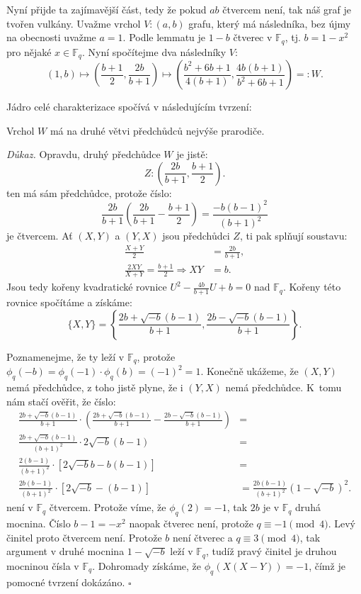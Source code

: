 \documentclass[12pt]{report}
\begin{document}
Nyní přijde ta zajímavější část, tedy že pokud $ab$ čtvercem není, tak náš graf je tvořen vulkány. Uvažme vrchol $V : (a,b)$ grafu, který má následníka, bez újmy na obecnosti uvažme $a=1$. Podle lemmatu je $1-b$ čtverec v $\mathbb{F}_q$, tj. $b = 1-x^2$ pro nějaké $x \in \mathbb{F}_q$. Nyní spočítejme dva následníky $V$:
$$ (1,b) \longmapsto \left(\frac{b+1}{2}, \frac{2b}{b+1} \right) \longmapsto \left( \frac{b^2+6b+1}{4(b+1)}, \frac{4b(b+1)}{b^2+6b+1} \right) =: W. $$

Jádro celé charakterizace spočívá v následujícím tvrzení:

\begin{lemma*}
Vrchol $W$ má na druhé větvi předchůdců nejvýše prarodiče.
\end{lemma*}
\noindent \textit{Důkaz.}  Opravdu, druhý předchůdce $W$ je jistě:
$$Z : \left(\frac{2b}{b+1}, \frac{b+1}{2} \right).$$
ten má sám předchůdce, protože číslo:
$$\frac{2b}{b+1} \left( \frac{2b}{b+1} -  \frac{b+1}{2} \right) = \frac{-b (b-1)^2}{(b+1)^2}$$
je čtvercem. Ať $(X,Y)$ a $(Y,X)$ jsou předchůdci $Z$, ti pak splňují soustavu:
\begin{align*}
\frac{X+Y}{2} &= \frac{2b}{b+1},\\
\frac{2XY}{X+Y} =  \frac{b+1}{2} \Rightarrow XY &= b.
\end{align*}
Jsou tedy kořeny kvadratické rovnice $U^2 - \frac{4b}{b+1} U + b = 0$ nad $\mathbb{F}_q$.  Kořeny této rovnice spočítáme a získáme:
$$\lbrace X,Y \rbrace = \left\lbrace \frac{2b + \sqrt{-b}(b-1)}{b+1},\frac{2b - \sqrt{-b}(b-1)}{b+1} \right\rbrace.$$

Poznamenejme, že ty leží v $\mathbb{F}_q$, protože $\phi_q(-b) = \phi_q(-1)\cdot \phi_q(b) = (-1)^2 = 1$. Konečně ukážeme, že $(X,Y)$ nemá předchůdce, z toho jistě plyne, že i $(Y,X)$ nemá předchůdce. K~tomu nám stačí ověřit, že číslo:
\begin{align*}
\frac{2b + \sqrt{-b}(b-1)}{b+1} \cdot \left( \frac{2b + \sqrt{-b}(b-1)}{b+1} - \frac{2b - \sqrt{-b}(b-1)}{b+1} \right) &=\\
\frac{2b + \sqrt{-b}(b-1)}{(b+1)^2} \cdot 2 \sqrt{-b}(b-1)&=\\
\frac{2 (b-1)}{(b+1)^2} \cdot [2 \sqrt{-b} b - b(b-1)] &=\\
\frac{2 b(b-1)}{(b+1)^2} \cdot [2 \sqrt{-b}-(b-1)] &= \frac{2 b(b-1)}{(b+1)^2} (1-\sqrt{-b})^2.
\end{align*}
není v $\mathbb{F}_q$ čtvercem. Protože víme, že $\phi_q(2) = -1$, tak $2b$ je v $\mathbb{F}_q$ druhá mocnina. Číslo $b-1 = -x^2$ naopak čtverec není, protože $q \equiv -1 \pmod{4}$. Levý činitel proto čtvercem není. Protože $b$ není čtverec a $q \equiv 3 \pmod{4}$, tak argument v druhé mocnina $1-\sqrt{-b}$ leží v $\mathbb{F}_q$, tudíž pravý činitel je druhou mocninou čísla v $\mathbb{F}_q$. Dohromady získáme, že $\phi_q (X(X-Y)) = -1$, čímž je pomocné tvrzení dokázáno. \hfill $\square$
\end{document}
